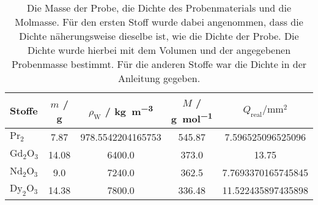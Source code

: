 \begin{table}\caption{Die Masse der Probe, die Dichte des Probenmaterials und die Molmasse. Für den ersten Stoff wurde dabei angenommen, dass die Dichte näherungsweise dieselbe ist, wie die Dichte der Probe. Die Dichte wurde hierbei mit dem Volumen und der angegebenen Probenmasse bestimmt. Für die anderen Stoffe war die Dichte in der Anleitung gegeben.}
\label{tab2}
\centering
{}
\begin{tabular}{l S S S S} 
\toprule
{Stoffe} & {$m$ / \si{\gram}} & {$\rho_\text{W}$ / \si[per-mode=fraction]{\kilo\gram\per\cubic\meter}} & {$M$ / \si[per-mode=fraction]{\gram\per\mol}} & {$Q_\text{real} / \si{\milli\meter\squared}$}\\
\midrule
$\text{Pr}_2$  & 7.87 & 978.5542204165753 & 545.87  & 7.596525096525096\\
$\text{Gd}_2 \text{O}_3$         & 14.08 & 6400.0 & 373.0             & 13.75\\
$\text{Nd}_2 \text{O}_3$         & 9.0 & 7240.0 & 362.5               & 7.7693370165745845\\
$\text{Dy}_2 \text{O}_3$         & 14.38 & 7800.0 & 336.48            & 11.522435897435898\\
\bottomrule
\end{tabular}\end{table}
